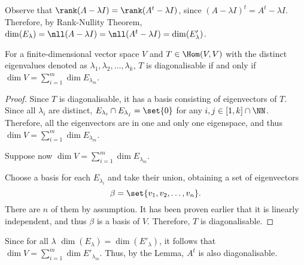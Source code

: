 \documentclass[11pt]{scrartcl}
\begin{document}
\begin{linenumbers}
  Observe that $\rank (A - \lambda I) = \rank (A^{t} - \lambda I)$,
  since $(A- \lambda I)^{t} = A^{t} - \lambda I$. Therefore, by
  Rank-Nullity Theorem,
  $\dim(E_{\lambda})  = \nll (A-\lambda I)  = \nll (A^{t} - \lambda I) = \dim(E'_{\lambda})$.
  \begin{lemma*}
    For a finite-dimensional vector space $V$ and $T \in \Hom(V,V)$
    with the distinct eigenvalues denoted as
    $\lambda_1, \lambda_2, \dots, \lambda_{k}$, $T$ is
    diagonalisable if and only if $\dim V = \sum_{i=1}^m \dim E_{\lambda_{m}}$.
  \end{lemma*}
  \begin{proof}
    Since $T$ is diagonalisable, it has a basis consisting of
    eigenvectors of $T$. Since all $\lambda_i$ are distinct,
    $E_{\lambda_i}\cap E_{\lambda_j} = \set{0}$ for any
    $i, j \in [1, k]\cap \NN$. Therefore, all the eigenvectors are in
    one and only one eigenspace, and thus
    $\dim V = \sum_{i=1}^m \dim E_{\lambda_{m}}$.

    Suppose now $\dim V = \sum_{i=1}^m \dim E_{\lambda_{m}}$.

    Choose a basis for each $E_{\lambda_{i}}$ and take their union,
    obtaining a set of eigenvectors
    \[\beta = \set{v_1, v_2,\dots, v_{n}}.\] There are $n$ of them by
    assumption. It has been proven earlier that it is linearly
    independent, and thus $\beta$ is a basis of $V$. Therefore, $T$ is
    diagonalisable.
  \end{proof}

  Since for all $\lambda$ $\dim(E_{\lambda}) = \dim(E'_{\lambda})$, it
  follows that $\dim V = \sum_{i=1}^m \dim E'_{\lambda_{m}}$. Thus, by
  the Lemma, $A^{t}$ is also diagonalisable.


\end{linenumbers}
\end{document}
